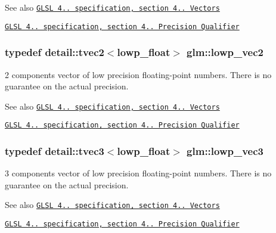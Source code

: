 \begin{DoxySeeAlso}{See also}
\href{http://www.opengl.org/registry/doc/GLSLangSpec.4.20.8.pdf}{\tt G\+L\+S\+L 4.. specification, section 4.. Vectors} 

\href{http://www.opengl.org/registry/doc/GLSLangSpec.4.20.8.pdf}{\tt G\+L\+S\+L 4.. specification, section 4.. Precision Qualifier} 
\end{DoxySeeAlso}
\hypertarget{group__core__precision_ga158d9bb292b42c86b36e8eaff3b22394}{}
\subsubsection[{lowp\+\_\+vec2}]{\setlength{\rightskip}{0pt plus 5cm}typedef detail\+::tvec2$<$lowp\+\_\+float$>$ {\bf glm\+::lowp\+\_\+vec2}}\label{group__core__precision_ga158d9bb292b42c86b36e8eaff3b22394}
2 components vector of low precision floating-\/point numbers. There is no guarantee on the actual precision.

\begin{DoxySeeAlso}{See also}
\href{http://www.opengl.org/registry/doc/GLSLangSpec.4.20.8.pdf}{\tt G\+L\+S\+L 4.. specification, section 4.. Vectors} 

\href{http://www.opengl.org/registry/doc/GLSLangSpec.4.20.8.pdf}{\tt G\+L\+S\+L 4.. specification, section 4.. Precision Qualifier} 
\end{DoxySeeAlso}
\hypertarget{group__core__precision_gaacc50c233ef2759c852eb90be78bc5fc}{}
\subsubsection[{lowp\+\_\+vec3}]{\setlength{\rightskip}{0pt plus 5cm}typedef detail\+::tvec3$<$lowp\+\_\+float$>$ {\bf glm\+::lowp\+\_\+vec3}}\label{group__core__precision_gaacc50c233ef2759c852eb90be78bc5fc}
3 components vector of low precision floating-\/point numbers. There is no guarantee on the actual precision.

\begin{DoxySeeAlso}{See also}
\href{http://www.opengl.org/registry/doc/GLSLangSpec.4.20.8.pdf}{\tt G\+L\+S\+L 4.. specification, section 4.. Vectors} 

\href{http://www.opengl.org/registry/doc/GLSLangSpec.4.20.8.pdf}{\tt G\+L\+S\+L 4.. specification, section 4.. Precision Qualifier} 
\end{DoxySeeAlso}
\hypertarget{group__core__precision_gabc7a12b5fe2a8b5b4d11961c284637dc}{}
